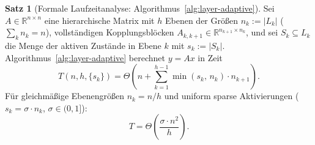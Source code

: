 \documentclass[a4paper,12pt]{report}
\theoremstyle{definition}
\newtheorem{satz}{Satz}
\begin{document}
	\begin{satz}[Formale Laufzeitanalyse: Algorithmus~\ref{alg:layer-adaptive}]
		\label{satz:laufzeit-layer-adaptive}
		Sei $A \in \mathbb{R}^{n \times n}$ eine hierarchische Matrix mit $h$ Ebenen der Größen $n_k := |L_k|$ ($\sum_k n_k = n$), vollständigen Kopplungsblöcken $A_{k,k{+}1} \in \mathbb{R}^{n_{k+1} \times n_k}$, und sei $S_k \subseteq L_k$ die Menge der aktiven Zustände in Ebene $k$ mit $s_k := |S_k|$. Algorithmus~\ref{alg:layer-adaptive} berechnet $y = Ax$ in Zeit
		\[
			T(n, h, \{s_k\}) = \Theta\!\left(n + \sum_{k=1}^{h-1} \min(s_k,\, n_k) \cdot n_{k+1}\right).
		\]
		Für gleichmäßige Ebenengrößen $n_k = n/h$ und uniform sparse Aktivierungen ($s_k = \sigma \cdot n_k$, $\sigma \in (0,1]$):
		\[
			T = \Theta\!\left(\frac{\sigma \cdot n^2}{h}\right).
		\]
	\end{satz}
\end{document}
